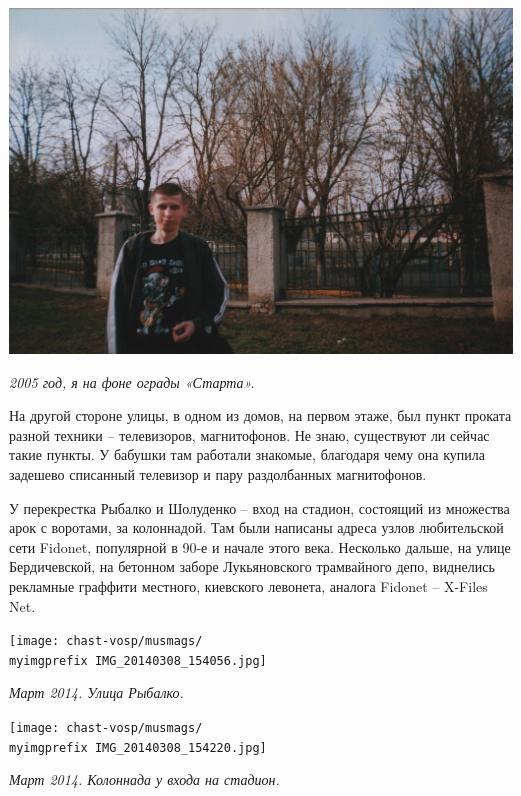 \begin{center}
\includegraphics[width=\linewidth]{chast-vosp/musmags/00.jpg}

\textit{2005 год, я на фоне ограды «Старта».}
\end{center}

На другой стороне улицы, в одном из домов, на первом этаже, был пункт проката разной техники – телевизоров, магнитофонов. Не знаю, существуют ли сейчас такие пункты. У бабушки там работали знакомые, благодаря чему она купила задешево списанный телевизор и пару раздолбанных магнитофонов.

У перекрестка Рыбалко и Шолуденко – вход на стадион, состоящий из множества арок с воротами, за колоннадой. Там были написаны адреса узлов любительской сети Fidonet, популярной в 90-е и начале этого века. Несколько дальше, на улице Бердичевской, на бетонном заборе Лукьяновского трамвайного депо, виднелись рекламные граффити местного, киевского левонета, аналога Fidonet – X-Files Net.

\begin{center}
\texttt{[image: chast-vosp/musmags/\\myimgprefix IMG\_20140308\_154056.jpg]}

\textit{Март 2014. Улица Рыбалко.}
\end{center}

\begin{center}
\texttt{[image: chast-vosp/musmags/\\myimgprefix IMG\_20140308\_154220.jpg]}

\textit{Март 2014. Колоннада у входа на стадион.}
\end{center}

